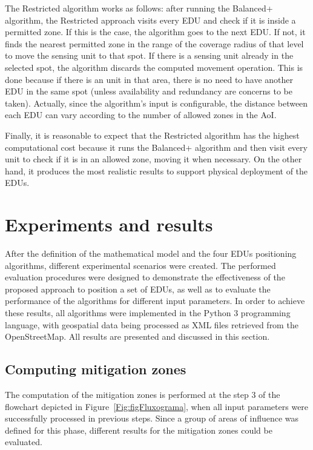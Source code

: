 \begin{refsection}
The Restricted algorithm works as follows: after running the Balanced+ algorithm, the Restricted approach visits every EDU and check if it is inside a permitted zone. If this is the case, the algorithm goes to the next EDU. If not, it finds the nearest permitted zone in the range of the coverage radius of that level to move the sensing unit to that spot. If there is a sensing unit already in the selected spot, the algorithm discards the computed movement operation. This is done because if there is an unit in that area, there is no need to have another EDU in the same spot (unless availability and redundancy are concerns to be taken). Actually, since the algorithm's input is configurable, the distance between each EDU can vary according to the number of allowed zones in the AoI. 

Finally, it is reasonable to expect that the Restricted algorithm has the highest computational cost because it runs the Balanced+ algorithm and then visit every unit to check if it is in an allowed zone, moving it when necessary. On the other hand, it produces the most realistic results to support physical deployment of the EDUs.

\section{Experiments and results}\label{S:5}

After the definition of the mathematical model and the four EDUs positioning algorithms, different experimental scenarios were created. The performed evaluation procedures were designed to demonstrate the effectiveness of the proposed approach to position a set of EDUs, as well as to evaluate the performance of the algorithms for different input parameters. In order to achieve these results, all algorithms were implemented in the Python 3 programming language, with geospatial data being processed as XML files retrieved from the OpenStreetMap. All results are presented and discussed in this section.

\subsection{Computing mitigation zones}

The computation of the mitigation zones is performed at the step 3 of the flowchart depicted in Figure~\ref{Fig:figFluxograma}, when all input parameters were successfully processed in previous steps. Since a group of areas of influence was defined for this phase, different results for the mitigation zones could be evaluated. 


\end{refsection}
